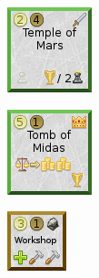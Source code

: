 \documentclass{article}
\begin{document}
\begin{figure}
  \begin{subfigure}{}
    \includegraphics[scale=1]{../rules/png/doe_wonder_temple_of_mars.png}
  \end{subfigure}
  \begin{subfigure}{}
    \includegraphics[scale=1]{../rules/png/doe_wonder_tomb_of_midas.png}
  \end{subfigure}
  \begin{subfigure}{}
    \includegraphics[scale=1]{../rules/png/doe_building_workshop.png}
  \end{subfigure}
\end{figure}
\end{document}
